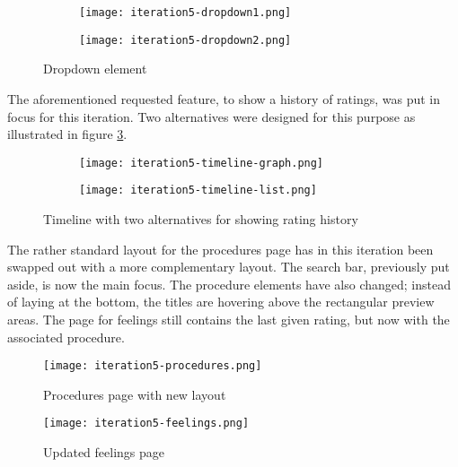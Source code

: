 \begin{figure}
    \centering
    \begin{subfigure}[t]{0.45\textwidth}
        \centering
        \vspace{0pt}
        \texttt{[image: iteration5-dropdown1.png]}
        \label{fig:i5-dropdown1}
    \end{subfigure}
    \begin{subfigure}[t]{0.45\textwidth}
        \centering
        \vspace{0pt}
        \texttt{[image: iteration5-dropdown2.png]}
        \label{fig:i5-dropdown2}
    \end{subfigure}
    \caption{Dropdown element}
    \label{fig:i5-dropdown}
\end{figure}


The aforementioned requested feature, to show a history of ratings, was put in focus for this iteration. Two alternatives were designed for this purpose as illustrated in figure \ref{fig:i5-dropdown}.

\begin{figure}
    \centering
    \begin{subfigure}{0.45\textwidth}
        \centering
        \texttt{[image: iteration5-timeline-graph.png]}
        \label{fig:i5-timeline-graph}
    \end{subfigure}
    \begin{subfigure}{0.45\textwidth}
        \centering
        \texttt{[image: iteration5-timeline-list.png]}
        \label{fig:i5-timeline-list}
    \end{subfigure}
    \caption{Timeline with two alternatives for showing rating history}
    \label{fig:i5-timeline}
\end{figure}

The rather standard layout for the procedures page has in this iteration been swapped out with a more complementary layout. The search bar, previously put aside, is now the main focus. The procedure elements have also changed; instead of laying at the bottom, the titles are hovering above the rectangular preview areas. The page for feelings still contains the last given rating, but now with the associated procedure.

\begin{figure}
    \centering
    \begin{minipage}{0.45\textwidth}
        \centering
        \texttt{[image: iteration5-procedures.png]}
        \caption{Procedures page with new layout}
        \label{fig:i5-procedures}
    \end{minipage}
    \begin{minipage}{0.45\textwidth}
        \centering
        \texttt{[image: iteration5-feelings.png]}
        \caption{Updated feelings page}
        \label{fig:i5-feelings}
    \end{minipage}
\end{figure}

